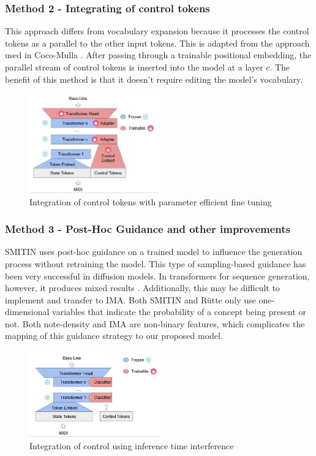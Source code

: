 \subsubsection{Method 2 - Integrating of control tokens} 

This approach differs from vocabulary expansion because it processes the control tokens as a parallel to the other input tokens. This is adapted from the approach used in Coco-Mulla \cite{Lin_cocomulla_2024}. After passing through a trainable positional embedding, the parallel stream of control tokens is inserted into the model at a layer $c$. The benefit of this method is that it doesn't require editing the model's vocabulary. 

\begin{figure}[H]
\centering
\includegraphics[width=0.5\textwidth]{IMAGES/ControlTokensLora.jpg} 
\caption{Integration of control tokens with parameter efficient fine tuning}
\label{fig:controltok}
\end{figure}

\subsubsection{Method 3 - Post-Hoc Guidance and other improvements}

SMITIN\cite{Koo_Wichern_Germain_SMITIN_2024} uses post-hoc guidance on a trained model to influence the generation process without retraining the model. This type of sampling-based guidance has been very successful in diffusion models. In transformers for sequence generation, however, it produces mixed results \cite{language_guide_rutte_2024}. Additionally, this may be difficult to implement and transfer to IMA. Both SMITIN and Rütte \cite{language_guide_rutte_2024} only use one-dimensional variables that indicate the probability of a concept being present or not. Both note-density and IMA are non-binary features, which complicates the mapping of this guidance strategy to our proposed model. 

\begin{figure}[H]
\centering
\includegraphics[width=0.5\textwidth]{IMAGES/adhoccontrol.jpg} 
\caption{Integration of control using inference time interference}
\label{fig:adhoccontrol}
\end{figure}

